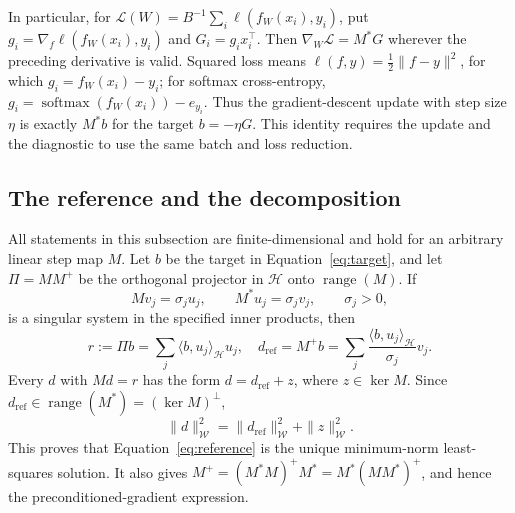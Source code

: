 \documentclass{article}
\theoremstyle{definition}
\theoremstyle{remark}
\begin{document}
In particular, for
$\mathcal L(W)=B^{-1}\sum_i\ell(f_W(x_i),y_i)$, put
$g_i=\nabla_f\ell(f_W(x_i),y_i)$ and $G_i=g_i x_i^\top$.
Then $\nabla_W\mathcal L=M^*G$ wherever the preceding derivative is valid. Squared loss means $\ell(f,y)=\tfrac12\|f-y\|^2$, for which $g_i=f_W(x_i)-y_i$; for softmax cross-entropy, $g_i=\operatorname{softmax}(f_W(x_i))-e_{y_i}$. Thus the gradient-descent update with step size $\eta$ is exactly $M^*b$ for the target $b=-\eta G$. This identity requires the update and the diagnostic to use the same batch and loss reduction.

\subsection{The reference and the decomposition}

All statements in this subsection are finite-dimensional and hold for an arbitrary linear step map $M$. Let $b$ be the target in Equation~\eqref{eq:target}, and let $\Pi=MM^+$ be the orthogonal projector in $\mathcal H$ onto $\operatorname{range}(M)$. If
\begin{equation}
 Mv_j=\sigma_j u_j,\qquad M^*u_j=\sigma_j v_j,\qquad \sigma_j>0,
\end{equation}
is a singular system in the specified inner products, then
\begin{equation}
 r:=\Pi b=\sum_j\langle b,u_j\rangle_{\mathcal H}u_j,
 \quad
 d_{\mathrm{ref}}=M^+b
 =\sum_j\frac{\langle b,u_j\rangle_{\mathcal H}}{\sigma_j}v_j.
 \label{eq:app-svd-ref}
\end{equation}
Every $d$ with $Md=r$ has the form $d=d_{\mathrm{ref}}+z$, where $z\in\ker M$. Since $d_{\mathrm{ref}}\in\operatorname{range}(M^*)=(\ker M)^\perp$,
\begin{equation}
 \|d\|_{\mathcal W}^2=\|d_{\mathrm{ref}}\|_{\mathcal W}^2+\|z\|_{\mathcal W}^2.
\end{equation}
This proves that Equation~\eqref{eq:reference} is the unique minimum-norm least-squares solution. It also gives
$M^+=(M^*M)^+M^*=M^*(MM^*)^+$, and hence the preconditioned-gradient expression.
\end{document}
